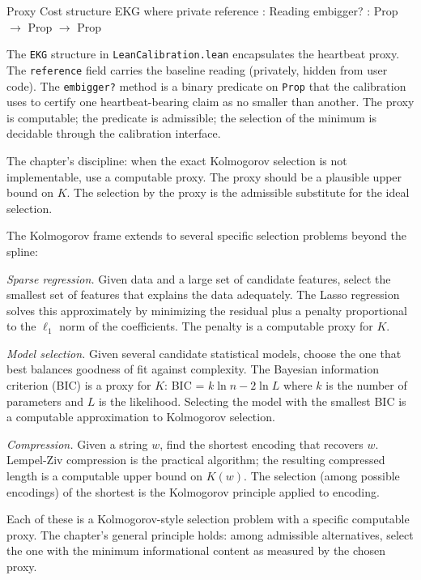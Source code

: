 \begin{leanexcerpt}{Proxy Cost}
structure EKG where
  private reference : Reading
  embigger? : Prop $\to$ Prop $\to$ Prop
\end{leanexcerpt}

The \texttt{EKG} structure in \texttt{LeanCalibration.lean}
encapsulates the heartbeat proxy. The \texttt{reference} field
carries the baseline reading (privately, hidden from user code).
The \texttt{embigger?} method is a binary predicate on
\texttt{Prop} that the calibration uses to certify one
heartbeat-bearing claim as no smaller than another. The proxy is
computable; the predicate is admissible; the selection of the
minimum is decidable through the calibration interface.

The chapter's discipline: when the exact Kolmogorov selection is
not implementable, use a computable proxy. The proxy should be a
plausible upper bound on $K$. The selection by the proxy is the
admissible substitute for the ideal selection.

The Kolmogorov frame extends to several specific selection problems
beyond the spline:

\emph{Sparse regression.} Given data and a large set of candidate
features, select the smallest set of features that explains the
data adequately. The Lasso regression solves this approximately by
minimizing the residual plus a penalty proportional to the
$\ell_1$ norm of the coefficients. The penalty is a computable
proxy for $K$.

\emph{Model selection.} Given several candidate statistical models,
choose the one that best balances goodness of fit against
complexity. The Bayesian information criterion (BIC) is a proxy
for $K$: BIC = $k \ln n - 2 \ln L$ where $k$ is the number of
parameters and $L$ is the likelihood. Selecting the model with
the smallest BIC is a computable approximation to Kolmogorov
selection.

\emph{Compression.} Given a string $w$, find the shortest encoding
that recovers $w$. Lempel-Ziv compression is the practical
algorithm; the resulting compressed length is a computable upper
bound on $K(w)$. The selection (among possible encodings) of the
shortest is the Kolmogorov principle applied to encoding.

Each of these is a Kolmogorov-style selection problem with a
specific computable proxy. The chapter's general principle holds:
among admissible alternatives, select the one with the minimum
informational content as measured by the chosen proxy.

